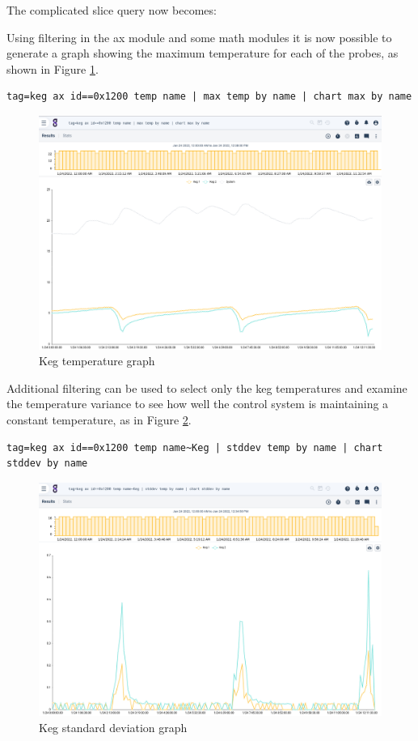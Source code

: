 The complicated slice query now becomes:


Using filtering in the ax module and some math modules it is now
possible to generate a graph showing the maximum temperature for each of
the probes, as shown in Figure \ref{fig:keg-temps}.

\begin{Verbatim}[breaklines=true]
tag=keg ax id==0x1200 temp name | max temp by name | chart max by name
\end{Verbatim}

\begin{figure}
	\includegraphics[width=0.65\linewidth]{images/keg-temps.png}
	\caption{Keg temperature graph}
	\label{fig:keg-temps}
\end{figure}

Additional filtering can be used to select only the keg temperatures
and examine the temperature variance to see how well the control system
is maintaining a constant temperature, as in Figure \ref{fig:keg-stddev}.

\begin{Verbatim}[breaklines=true]
tag=keg ax id==0x1200 temp name~Keg | stddev temp by name | chart stddev by name
\end{Verbatim}

\begin{figure}
	\includegraphics[width=0.65\linewidth]{images/keg-stddev.png}
	\caption{Keg standard deviation graph}
	\label{fig:keg-stddev}
\end{figure}

